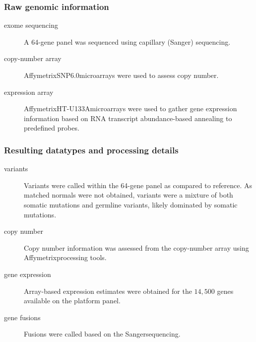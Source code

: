 \subsubsection{Raw genomic information}

\begin{description}
\item[exome sequencing]
  A 64-gene panel was sequenced using capillary (Sanger\reg)
  sequencing.

  
\item[copy-number array]
  Affymetrix\reg SNP6.0\tm microarrays were used to assess copy
  number. 

  
\item[expression array]
  Affymetrix\reg HT-U133A\reg microarrays were used to gather gene
  expression information based on RNA transcript abundance-based
  annealing to predefined probes.  
\end{description}


\subsubsection{Resulting datatypes and processing details}

\begin{description}
\item[variants]
  Variants were called within
  the 64-gene panel as compared to reference. As matched normals were
  not obtained, variants were a mixture of both somatic mutations and
  germline variants, likely dominated by somatic mutations.
\item[copy number]
  Copy number information was assessed from the copy-number array
  using Affymetrix\reg processing tools.

  
\item[gene expression]
  Array-based expression estimates were obtained for the $14,500$
  genes available on the platform panel.

  
\item[gene fusions]
  Fusions were called based on the Sanger\reg sequencing. 

\end{description}










